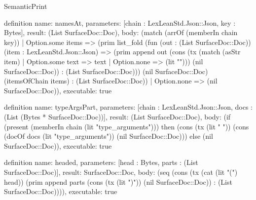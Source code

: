 \begin{lexlean}{SemanticPrint}
\begin{semanticmodule}
definition{
  name: namesAt,
  parameters: [chain : LexLeanStd.Json::Json, key : Bytes],
  result: (List SurfaceDoc::Doc),
  body: (match (arrOf (memberIn chain key))
    | Option.some items => (prim list_fold (fun (out : (List SurfaceDoc::Doc)) (item : LexLeanStd.Json::Json) => (prim append out (cons (tx (match (asStr item)
      | Option.some text => text
      | Option.none => (lit ""))) (nil SurfaceDoc::Doc)) : (List SurfaceDoc::Doc))) (nil SurfaceDoc::Doc) (itemsOfChain items) : (List SurfaceDoc::Doc))
    | Option.none => (nil SurfaceDoc::Doc)),
  executable: true
}

definition{
  name: typeArgsPart,
  parameters: [chain : LexLeanStd.Json::Json, docs : (List (Bytes * SurfaceDoc::Doc))],
  result: (List SurfaceDoc::Doc),
  body: (if (present (memberIn chain (lit "type_arguments"))) then (cons (tx (lit " ")) (cons (docOf docs (lit "type_arguments")) (nil SurfaceDoc::Doc))) else (nil SurfaceDoc::Doc)),
  executable: true
}

definition{
  name: headed,
  parameters: [head : Bytes, parts : (List SurfaceDoc::Doc)],
  result: SurfaceDoc::Doc,
  body: (seq (cons (tx (cat (lit "(") head)) (prim append parts (cons (tx (lit ")")) (nil SurfaceDoc::Doc)) : (List SurfaceDoc::Doc)))),
  executable: true
}


\end{semanticmodule}
\end{lexlean}
